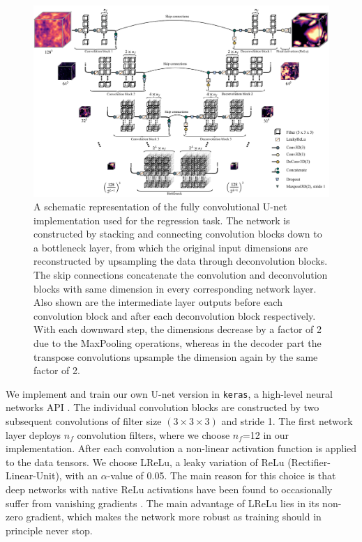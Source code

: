 \documentclass[fleqn,usenatbib]{mnras}
\begin{document}
 \begin{figure}
 \includegraphics[width=\textwidth]{figure_3.pdf}
 \caption{A schematic representation of the fully convolutional U-net implementation used for the regression task. The network is constructed by stacking and connecting convolution blocks down to a bottleneck layer, from which the original input dimensions are reconstructed by upsampling the data through deconvolution blocks. The skip connections concatenate the convolution and deconvolution blocks with same dimension in every corresponding network layer. Also shown are the intermediate layer outputs before each convolution block and after each deconvolution block respectively. With each downward step, the dimensions decrease by a factor of 2 due to the MaxPooling operations, whereas in the decoder part the transpose convolutions upsample the dimension again by the same factor of 2.}
 \label{fig:network}
\end{figure}
We implement and train our own U-net version in \texttt{keras}, a high-level neural networks API \citep{Chollet2015}.
The individual convolution blocks are constructed by two subsequent convolutions of filter size $(3\times 3\times 3)$ and stride 1. The first network layer deploys $n_{f}$ convolution filters, where we choose $n_{f}$=12 in our implementation. After each convolution a non-linear activation function is applied to the data tensors. We choose LReLu, a leaky variation of ReLu (Rectifier-Linear-Unit), with an $\alpha$-value of 0.05. The main reason for this choice is that deep networks with native ReLu activations have been found to occasionally suffer from vanishing gradients \cite[e.g.][]{bengio1994}. The main advantage of LReLu lies in its non-zero gradient, which makes the network more robust as training should in principle never stop.
\end{document}
